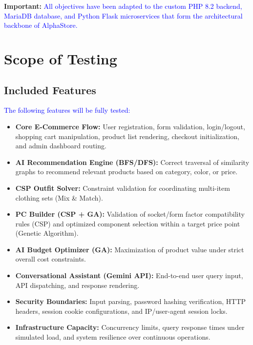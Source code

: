 \documentclass[12pt,a4paper]{article}
\newcommand{\student}[1]{\textcolor{blue}{#1}} %
\begin{document}
\textbf{Important:}
\student{All objectives have been adapted to the custom PHP 8.2 backend, MariaDB database, and Python Flask microservices that form the architectural backbone of AlphaStore.}

\section{Scope of Testing}

\subsection{Included Features}
\student{The following features will be fully tested:}
\begin{itemize}
\item \textbf{Core E-Commerce Flow:} User registration, form validation, login/logout, shopping cart manipulation, product list rendering, checkout initialization, and admin dashboard routing.
\item \textbf{AI Recommendation Engine (BFS/DFS):} Correct traversal of similarity graphs to recommend relevant products based on category, color, or price.
\item \textbf{CSP Outfit Solver:} Constraint validation for coordinating multi-item clothing sets (Mix \& Match).
\item \textbf{PC Builder (CSP + GA):} Validation of socket/form factor compatibility rules (CSP) and optimized component selection within a target price point (Genetic Algorithm).
\item \textbf{AI Budget Optimizer (GA):} Maximization of product value under strict overall cost constraints.
\item \textbf{Conversational Assistant (Gemini API):} End-to-end user query input, API dispatching, and response rendering.
\item \textbf{Security Boundaries:} Input parsing, password hashing verification, HTTP headers, session cookie configurations, and IP/user-agent session locks.
\item \textbf{Infrastructure Capacity:} Concurrency limits, query response times under simulated load, and system resilience over continuous operations.
\end{itemize}
\end{document}
